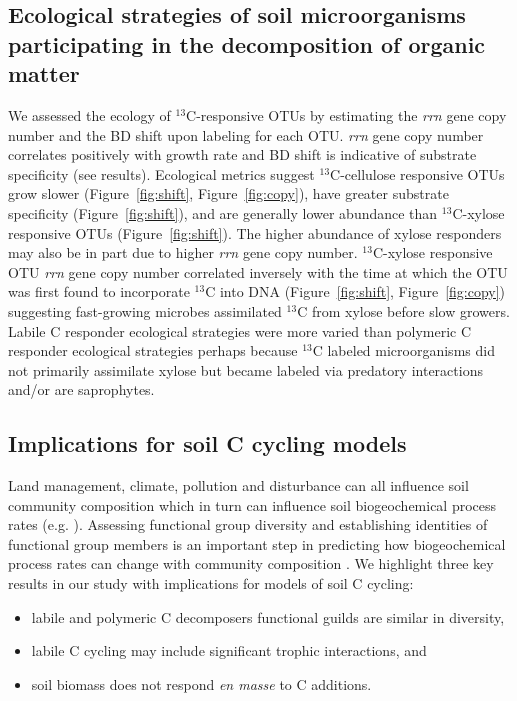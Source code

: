 \subsection{Ecological strategies of soil microorganisms participating in the
decomposition of organic matter}
We assessed the ecology of $^{13}$C-responsive OTUs by estimating the
\textit{rrn} gene copy number and the BD shift upon labeling for each OTU.
\textit{rrn} gene copy number correlates positively with growth rate
\citep{11125085} and BD shift is indicative of substrate specificity (see
results). Ecological metrics suggest $^{13}$C-cellulose responsive OTUs grow
slower (Figure~\ref{fig:shift}, Figure~\ref{fig:copy}), have greater substrate
specificity (Figure~\ref{fig:shift}), and are generally lower abundance than
$^{13}$C-xylose responsive OTUs (Figure~\ref{fig:shift}). The higher abundance
of xylose responders may also be in part due to higher \textit{rrn} gene copy
number. $^{13}$C-xylose responsive OTU \textit{rrn} gene copy number correlated
inversely with the time at which the OTU was first found to incorporate
$^{13}$C into DNA (Figure~\ref{fig:shift}, Figure~\ref{fig:copy}) suggesting
fast-growing microbes assimilated $^{13}$C from xylose before slow growers.
Labile C responder ecological strategies were more varied than polymeric
C responder ecological strategies perhaps because $^{13}$C labeled
microorganisms did not primarily assimilate xylose but became labeled via
predatory interactions and/or are saprophytes. 

\subsection{Implications for soil C cycling models}
Land management, climate, pollution and disturbance can all influence soil
community composition \citep{McGuire2010}which in turn can influence soil
biogeochemical process rates (e.g. \citep{Berlemont2014a}). Assessing
functional group diversity and establishing identities of functional group
members is an important step in predicting how biogeochemical process rates can
change with community composition \citep{Schimel_1995,McGuire2010}. We
highlight three key results in our study with implications for models of soil
C cycling: \begin{itemize} \item labile and polymeric C decomposers functional
guilds are similar in diversity, \item labile C cycling may include significant
trophic interactions, and \item soil biomass does not respond \textit{en masse}
to C additions.\end{itemize}

